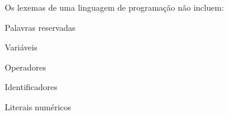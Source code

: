 \question[10]

Os lexemas de uma linguagem de programação não incluem:

\begin{choices}
\item Palavras reservadas
\item Variáveis %
\item Operadores
\item Identificadores
\item Literais numéricos
\end{choices}
\answerline

